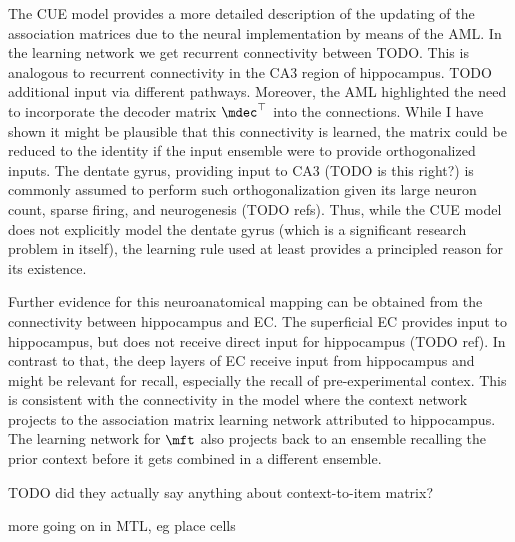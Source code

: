 The CUE model provides a more detailed description of the updating of the association matrices due to the neural implementation by means of the AML\@.
In the learning network we get recurrent connectivity between TODO\@.
This is analogous to recurrent connectivity in the CA3 region of hippocampus.
TODO additional input via different pathways.
Moreover, the AML highlighted the need to incorporate the decoder matrix $\mdec\Tr$ into the connections.
While I have shown it might be plausible that this connectivity is learned, the matrix could be reduced to the identity if the input ensemble were to provide orthogonalized inputs.
The dentate gyrus, providing input to CA3 (TODO is this right?) is commonly assumed to perform such orthogonalization given its large neuron count, sparse firing, and neurogenesis (TODO refs).
Thus, while the CUE model does not explicitly model the dentate gyrus (which is a significant research problem in itself), the learning rule used at least provides a principled reason for its existence.

Further evidence for this neuroanatomical mapping can be obtained from the connectivity between hippocampus and EC\@.
The superficial EC provides input to hippocampus, but does not receive direct input for hippocampus (TODO ref).
In contrast to that, the deep layers of EC receive input from hippocampus and might be relevant for recall, especially the recall of pre-experimental contex.
This is consistent with the connectivity in the model where the context network projects to the association matrix learning network attributed to hippocampus.
The learning network for $\mft$ also projects back to an ensemble recalling the prior context before it gets combined in a different ensemble.


TODO did they actually say anything about context-to-item matrix?

more going on in MTL, eg place cells
